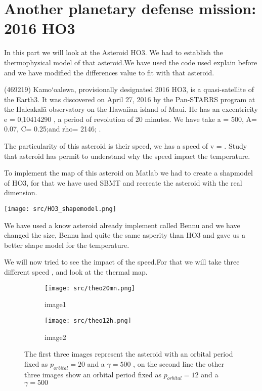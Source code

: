 \section{Another planetary defense mission: 2016 HO3}
\label{HO3}

In this part we will look at the Asteroid HO3. We had to establish the thermophysical model of that asteroid.We have used the code used explain before and we have modified the differences value to fit with that asteroid.\newline

(469219) Kamo‘oalewa, provisionally designated 2016 HO3, is a quasi-satellite of the Earth3. It was discovered on April 27, 2016 by the Pan-STARRS program at the Haleakalā observatory on the Hawaiian island of Maui.\newline
He has an excentricity e = 0,10414290 , a period of revolution of 20 minutes. We have take a \gamme = 500, A= 0.07, C= 0.25;and rho= 2146; .\newline

The particularity of this asteroid is their speed, we has a speed of v = . Study that asteroid has permit to understand why the speed impact the temperature.

To implement the map of this asteroid on Matlab we had to create a shapmodel of HO3, for that we have used SBMT and recreate the asteroid with the real dimension.\newline 
\begin{center}
    \captionsetup{type=figure}
    \texttt{[image: src/HO3\_shapemodel.png]}
\end{center}

We have used a know asteroid already implement called Bennu and we have changed the size, Bennu had quite the same asperity than HO3 and gave us a better shape model for the temperature.



We will now tried to see the impact of the speed.For that we will take three different speed , and look at the thermal map.\\[10pt]


\begin{figure}[htb]
    \centering %
\begin{subfigure}{0.25\textwidth}
  \texttt{[image: src/theo20mn.png]}
  \caption{image1}
  \label{fig:1}
\end{subfigure}\hfil %
\begin{subfigure}{0.25\textwidth}
  \texttt{[image: src/theo12h.png]}
  \caption{image2}
  \label{fig:2}
\end{subfigure}\hfil %
\caption{The first three images represent the asteroid with an orbital period fixed as $p_{orbital}=20 $ \minutes and a $\gamma = 500 $ , on the second line the other three images show an orbital period fixed as $p_{orbital}= 12 $ \hours and a $\gamma = 500 $}
\label{fig:images}
\end{figure}


